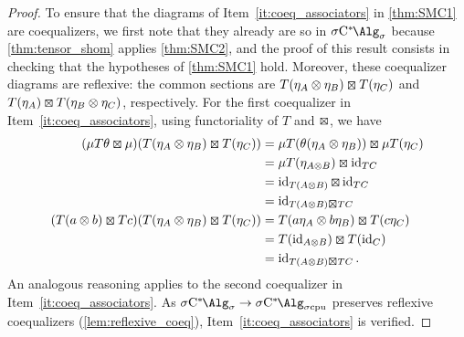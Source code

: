 \begin{proof}
	To ensure that the diagrams of Item~\ref{it:coeq_associators} in \cref{thm:SMC1} are coequalizers, we first note that they already are so in $\SigmaC$ because \cref{thm:tensor_shom} applies \cref{thm:SMC2}, and the proof of this result consists in checking that the hypotheses of \cref{thm:SMC1} hold.
	Moreover, these coequalizer diagrams are reflexive: the common sections are $T(\eta_{\A}\otimes \eta_{\B})\kocktensor T(\eta_{\C})$ and $T(\eta_{\A})\kocktensor T(\eta_{\B}\otimes \eta_{\C})$, respectively.
	For the first coequalizer in Item~\ref{it:coeq_associators}, using functoriality of $T$ and $\kocktensor$, we have
		\begin{align*}
			(\mu T\theta \kocktensor \mu )(T(\eta_{\A}\otimes \eta_{\B})\kocktensor T(\eta_{\C}) ) & = \mu T(\theta (\eta_{\A}\otimes \eta_{\B}))\kocktensor \mu T(\eta_{\C})\\
			                                                                                       & = \mu T(\eta_{\A\otimes \B}) \kocktensor \id_{T\C}                      \\
			                                                                                       & = \id_{T(A\otimes B)}\kocktensor \id_{T\C}                              \\
			                                                                                       & = \id_{T(\A\otimes B)\kocktensor T\C}                                   \\
			(T(a\otimes b)\kocktensor Tc)(T(\eta_{\A}\otimes \eta_{\B})\kocktensor T(\eta_{\C}) )  & = T(a\eta_{\A}\otimes b\eta_{\B}) \kocktensor T(c\eta_{\C})             \\
			                                                                                       & = T(\id_{\A\otimes \B})\kocktensor T(\id_{\C})                          \\
			                                                                                       & = \id_{T(\A\otimes B)\kocktensor T\C}.
		\end{align*}
	An analogous reasoning applies to the second coequalizer in Item~\ref{it:coeq_associators}.
	As $\SigmaC \to \SigmaCcpu$ preserves reflexive coequalizers (\cref{lem:reflexive_coeq}), Item~\ref{it:coeq_associators} is verified.


\end{proof}
